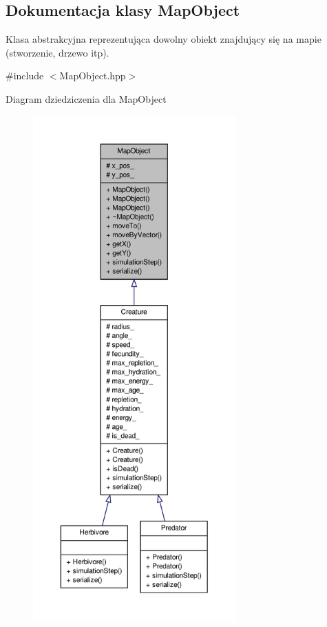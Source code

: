 \hypertarget{classMapObject}{\subsection{Dokumentacja klasy Map\-Object}
\label{classMapObject}
}


Klasa abstrakcyjna reprezentująca dowolny obiekt znajdujący się na mapie (stworzenie, drzewo itp).  




{\ttfamily \#include $<$Map\-Object.\-hpp$>$}



Diagram dziedziczenia dla Map\-Object
\nopagebreak
\begin{figure}[H]
\begin{center}
\leavevmode
\includegraphics[height=550pt]{classMapObject__inherit__graph}
\end{center}
\end{figure}



